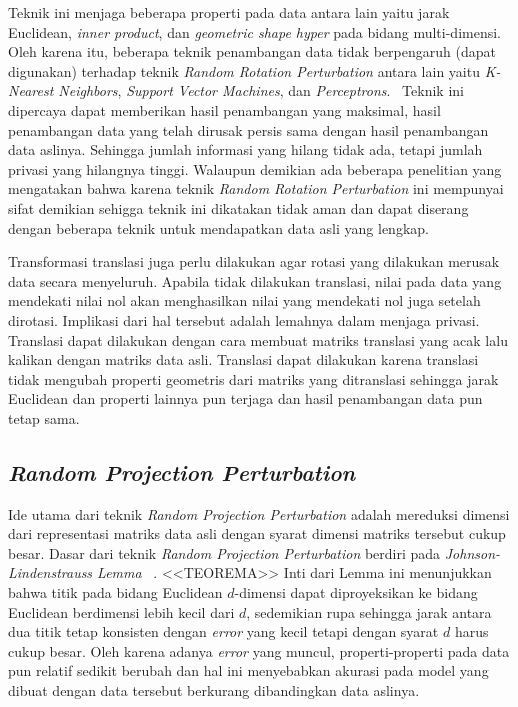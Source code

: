 Teknik ini menjaga beberapa properti pada data antara lain yaitu jarak Euclidean, \textit{inner product}, dan \textit{geometric shape hyper} pada bidang multi-dimensi.~\cite{rezaseifi:11:ppdm} Oleh karena itu, beberapa teknik penambangan data tidak berpengaruh (dapat digunakan) terhadap teknik \textit{Random Rotation Perturbation} antara lain yaitu \textit{K-Nearest Neighbors}, \textit{Support Vector Machines}, dan \textit{Perceptrons}.~\cite{rotation:05:chenliu} Teknik ini dipercaya dapat memberikan hasil penambangan yang maksimal, hasil penambangan data yang telah dirusak persis sama dengan hasil penambangan data aslinya. Sehingga jumlah informasi yang hilang tidak ada, tetapi jumlah privasi yang hilangnya tinggi. Walaupun demikian ada beberapa penelitian yang mengatakan bahwa karena teknik \textit{Random Rotation Perturbation} ini mempunyai sifat demikian sehigga teknik ini dikatakan tidak aman dan dapat diserang dengan beberapa teknik untuk mendapatkan data asli yang lengkap.

Transformasi translasi juga perlu dilakukan agar rotasi yang dilakukan merusak data secara menyeluruh. Apabila tidak dilakukan translasi, nilai pada data yang mendekati nilai nol akan menghasilkan nilai yang mendekati nol juga setelah dirotasi. Implikasi dari hal tersebut adalah lemahnya dalam menjaga privasi. Translasi dapat dilakukan dengan cara membuat matriks translasi yang acak lalu kalikan dengan matriks data asli. Translasi dapat dilakukan karena translasi tidak mengubah properti geometris dari matriks yang ditranslasi sehingga jarak Euclidean dan properti lainnya pun terjaga dan hasil penambangan data pun tetap sama.

\subsection{\textit{Random Projection Perturbation}}
\label{subsec:rpp}

Ide utama dari teknik \textit{Random Projection Perturbation} adalah mereduksi dimensi dari representasi matriks data asli dengan syarat dimensi matriks tersebut cukup besar. Dasar dari teknik \textit{Random Projection Perturbation} berdiri pada \textit{Johnson-Lindenstrauss Lemma} ~\cite{lindestrauss:84:jllemma}. 
<<TEOREMA>>
Inti dari Lemma ini menunjukkan bahwa titik pada bidang Euclidean \(d\)-dimensi dapat diproyeksikan ke bidang Euclidean berdimensi lebih kecil dari \(d\), sedemikian rupa sehingga jarak antara dua titik tetap konsisten dengan \textit{error} yang kecil tetapi dengan syarat \(d\) harus cukup besar. Oleh karena adanya \textit{error} yang muncul, properti-properti pada data pun relatif sedikit berubah dan hal ini menyebabkan akurasi pada model yang dibuat dengan data tersebut berkurang dibandingkan data aslinya.~\cite{kargupta:06:projection}

